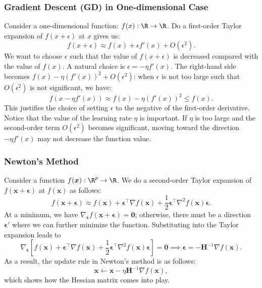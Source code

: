     \subsubsection{Gradient Descent (GD) in One-dimensional Case}
    Consider a one-dimensional function: $f(x): \R \rightarrow \R$.
    Do a first-order Taylor expansion of $f(x + \epsilon)$ at $x$ gives us:
        \begin{equation}
                f(x + \epsilon) \approx f(x) + \epsilon f'(x) + O(\epsilon^2).
        \end{equation}
    We want to choose $\epsilon$ such that the value of $f(x + \epsilon)$ is decreased compared with the value of $f(x)$.
    A natural choice is $\epsilon = -\eta f'(x)$.
    The right-hand side becomes $f(x) - \eta (f'(x))^2 + O(\epsilon^2)$: when $\epsilon$ is not too large such that $O(\epsilon^2)$ is not significant, we have:
        \begin{equation}
            f(x - \eta f'(x)) \approx f(x) - \eta (f'(x))^2 \le f(x).
        \end{equation}
    This justifies the choice of setting $\epsilon$ to the negative of the first-order derivative.
    Notice that the value of the learning rate $\eta$ is important.
    If $\eta$ is too large and the second-order term $O(\epsilon^2)$ becomes significant, moving toward the direction $-\eta f'(x)$ may not decrease the function value.
    
    \subsubsection{Newton's Method}\label{newton-method}
        Consider a function $f(\bm{x}): \R^\nfeat \rightarrow \R$.
        We do a second-order Taylor expansion of $f(\bm{x} + \bm{\epsilon})$ at $f(\bm{x})$ as follows:
            \begin{equation}
                f(\bm{x} + \bm{\epsilon}) \approx f(\bm{x}) + \bm{\epsilon}^{\top} \nabla f(\bm{x}) + \frac{1}{2} \bm{\epsilon}^\top \nabla^2 f(\bm{x}) \bm{\epsilon}.
            \end{equation}
        At a minimum, we have $\nabla_{\bm{\epsilon}} f(\bm{x}+\bm{\epsilon}) = \bm{0}$; otherwise, there must be a direction $\bm{\epsilon}'$ where we can further minimize the function.
        Substituting into the Taylor expansion leads to 
            \begin{equation}
                \nabla_{\bm{\epsilon}}\left[ f(\bm{x}) + \bm{\epsilon}^{\top} \nabla f(\bm{x}) + \frac{1}{2} \bm{\epsilon}^\top \nabla^2 f(\bm{x}) \bm{\epsilon}\right] = \bm{0} \implies \bm{\epsilon} = -\bm{H}^{-1} \nabla f(\bm{x}).
            \end{equation}
        As a result, the update rule in Newton's method is as follows:
            \begin{equation}
                \bm{x} \leftarrow \bm{x} - \eta \bm{H}^{-1} \nabla f(\bm{x}),
            \end{equation}
        which shows how the Hessian matrix comes into play.
    

